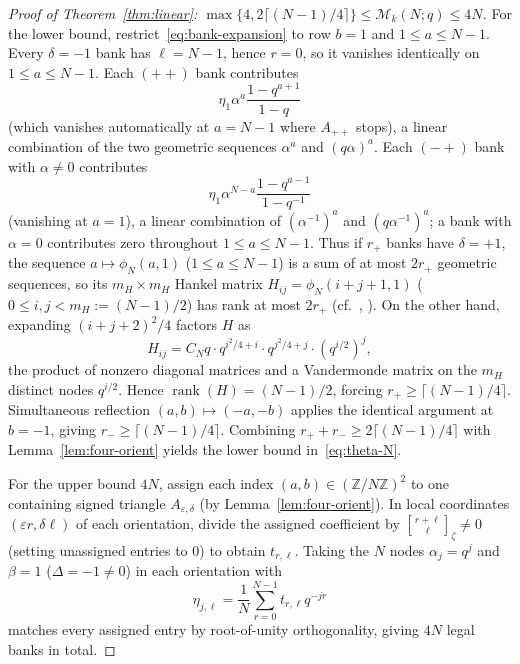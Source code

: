 \documentclass[11pt,reqno]{amsart}
\numberwithin{equation}{section}
\theoremstyle{definition}
\theoremstyle{remark}
\newcommand{\Z}{\mathbb{Z}}
\newcommand{\rank}{\operatorname{rank}}
\newcommand{\gb}[3]{\genfrac{[}{]}{0pt}{}{#1}{#2}_{#3}}
\newcommand{\eps}{\varepsilon}
\newcommand{\M}{\mathcal{M}}
\begin{document}
\begin{proof}[Proof of Theorem~\ref{thm:linear}: $\max\{4,2\lceil(N-1)/4\rceil\}\le \M_k(N;q)\le 4N$]
For the lower bound, restrict~\eqref{eq:bank-expansion} to row $b=1$ and $1\le a\le N-1$. Every $\delta=-1$ bank has $\ell=N-1$, hence $r=0$, so it vanishes identically on $1\le a\le N-1$. Each $(++)$ bank contributes
\[
\eta_1 \alpha^a \frac{1-q^{a+1}}{1-q}
\]
(which vanishes automatically at $a=N-1$ where $A_{++}$ stops), a linear combination of the two geometric sequences $\alpha^a$ and $(q\alpha)^a$. Each $(-+)$ bank with $\alpha\ne 0$ contributes
\[
\eta_1 \alpha^{N-a}\frac{1-q^{a-1}}{1-q^{-1}}
\]
(vanishing at $a=1$), a linear combination of $(\alpha^{-1})^a$ and $(q\alpha^{-1})^a$; a bank with $\alpha=0$ contributes zero throughout $1\le a\le N-1$. Thus if $r_+$ banks have $\delta=+1$, the sequence $a\mapsto\phi_N(a,1)$ ($1\le a\le N-1$) is a sum of at most $2r_+$ geometric sequences, so its $m_H\times m_H$ Hankel matrix $H_{ij} = \phi_N(i+j+1,1)$ ($0\le i,j<m_H:=(N-1)/2$) has rank at most $2r_+$ (cf.~\cite[Section~2]{PT10}, \cite[Theorem~2.1]{PP13}). On the other hand, expanding $(i+j+2)^2/4$ factors $H$ as
\[
H_{ij} = C_N q\cdot q^{i^2/4+i}\cdot q^{j^2/4+j}\cdot (q^{i/2})^j,
\]
the product of nonzero diagonal matrices and a Vandermonde matrix on the $m_H$ distinct nodes $q^{i/2}$. Hence $\rank(H)=(N-1)/2$, forcing $r_+\ge\lceil(N-1)/4\rceil$. Simultaneous reflection $(a,b)\mapsto(-a,-b)$ applies the identical argument at $b=-1$, giving $r_-\ge\lceil(N-1)/4\rceil$. Combining $r_++r_-\ge 2\lceil(N-1)/4\rceil$ with Lemma~\ref{lem:four-orient} yields the lower bound in~\eqref{eq:theta-N}.

For the upper bound $4N$, assign each index $(a,b)\in(\Z/N\Z)^2$ to one containing signed triangle $A_{\eps,\delta}$ (by Lemma~\ref{lem:four-orient}). In local coordinates $(\eps r,\delta\ell)$ of each orientation, divide the assigned coefficient by $\gb{r+\ell}{\ell}{\zeta}\ne 0$ (setting unassigned entries to $0$) to obtain $t_{r,\ell}$. Taking the $N$ nodes $\alpha_j=q^j$ and $\beta=1$ ($\Delta=-1\ne 0$) in each orientation with
\[
\eta_{j,\ell} = \frac{1}{N}\sum_{r=0}^{N-1} t_{r,\ell} q^{-jr}
\]
matches every assigned entry by root-of-unity orthogonality, giving $4N$ legal banks in total.
\end{proof}
\end{document}
